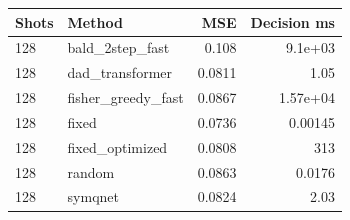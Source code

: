 \begin{tabular}{llrr}
\toprule
Shots & Method & MSE & Decision ms \\
\midrule
128 & bald\_2step\_fast & 0.108 & 9.1e+03 \\
128 & dad\_transformer & 0.0811 & 1.05 \\
128 & fisher\_greedy\_fast & 0.0867 & 1.57e+04 \\
128 & fixed & 0.0736 & 0.00145 \\
128 & fixed\_optimized & 0.0808 & 313 \\
128 & random & 0.0863 & 0.0176 \\
128 & symqnet & 0.0824 & 2.03 \\
\bottomrule
\end{tabular}
